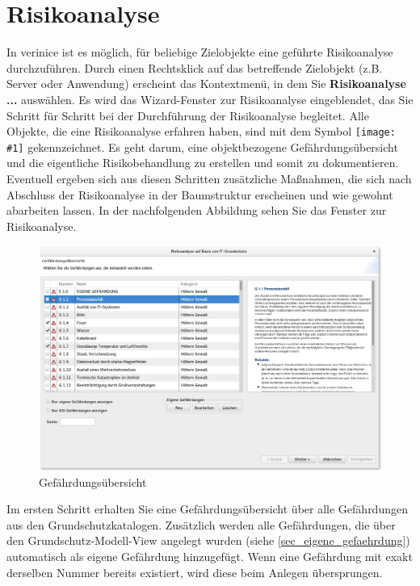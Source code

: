 \documentclass[a4paper,10pt]{book}
\newcommand{\icon}[1]{\texttt{[image: \#1]}}
\begin{document}
\section{Risikoanalyse} \label{Risikoanalyse}
In verinice ist es möglich, für beliebige Zielobjekte eine geführte Risikoanalyse durchzuführen. Durch einen Rechtsklick auf das betreffende Zielobjekt (z.B. Server oder Anwendung) erscheint das Kontextmenü, in dem Sie \textbf{Risikoanalyse ...} auswählen. Es wird das Wizard-Fenster zur Risikoanalyse eingeblendet, das Sie Schritt für Schritt bei der Durchführung der Risikoanalyse begleitet. Alle Objekte, die eine Risikoanalyse erfahren haben, sind mit dem Symbol \icon{Icon/Risikoanalyse.png} gekennzeichnet. Es geht darum, eine objektbezogene Gefährdungsübersicht und die eigentliche Risikobehandlung zu erstellen und somit zu dokumentieren. Eventuell ergeben sich aus diesen Schritten zusätzliche Maßnahmen, die sich nach Abschluss der Risikoanalyse in der Baumstruktur erscheinen und wie gewohnt abarbeiten lassen. In der nachfolgenden Abbildung sehen Sie das Fenster zur Risikoanalyse.
\newline
\begin{figure}[H]
  \centering
  \includegraphics[width=\textwidth]{Screenshot/gefaehrdungsuebersicht.png}
  \caption{\label{Gefaehrdungsuebersicht} Gefährdungsübersicht}
\end{figure}
Im ersten Schritt erhalten Sie eine Gefährdungsübersicht über alle Gefährdungen aus den Grundschutzkatalogen. Zusätzlich werden alle Gefährdungen, die über den Grundschutz-Modell-View angelegt wurden (siehe \ref{sec_eigene_gefaehrdung}) automatisch als eigene Gefährdung hinzugefügt. Wenn eine Gefährdung mit exakt derselben Nummer bereits existiert, wird diese beim Anlegen übersprungen.\\
\end{document}
